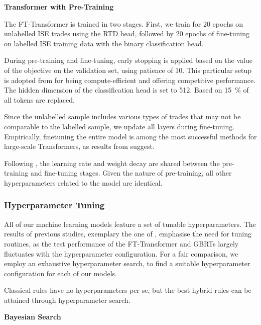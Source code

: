 \textbf{Transformer with Pre-Training}

The FT-Transformer is trained in two stages. First, we train for \num{20} epochs on unlabelled \gls{ISE} trades using the \gls{RTD} head, followed by \num{20} epochs of fine-tuning on labelled \gls{ISE} training data with the binary classification head.

During pre-training and fine-tuning, early stopping is applied based on the value of the objective on the validation set, using patience of \num{10}. This particular setup is adopted from \textcite[][15]{rubachevRevisitingPretrainingObjectives2022} for being compute-efficient and offering competitive performance. The hidden dimension of the classification head is set to \num{512}. Based on \textcite[][3]{clarkElectraPretrainingText2020} \SI{15}{\percent} of all tokens are replaced. 

Since the unlabelled sample includes various types of trades that may not be comparable to the labelled sample, we update all layers during fine-tuning. Empirically, finetuning the entire model is among the most successful methods for large-scale Transformers, as results from \textcite[][104--105]{raeScalingLanguageModels2022} suggest.

Following \textcite[][4]{rubachevRevisitingPretrainingObjectives2022}, the learning rate and weight decay are shared between the pre-training and fine-tuning stages. Given the nature of pre-training, all other hyperparameters related to the model are identical.

\subsubsection{Hyperparameter Tuning}\label{sec:hyperparameter-tuning}

All of our machine learning models feature a set of tunable hyperparameters. The results of previous studies, exemplary the one of \textcite[][5]{grinsztajnWhyTreebasedModels2022}, emphasise the need for tuning routines, as the test performance of the FT-Transformer and \glspl{GBRT} largely fluctuates with the hyperparameter configuration. For a fair comparison, we employ an exhaustive hyperparameter search, to find a suitable hyperparameter configuration for each of our models.

Classical rules have no hyperparameters per se, but the best hybrid rules can be attained through hyperparameter search.

\textbf{Bayesian Search}

